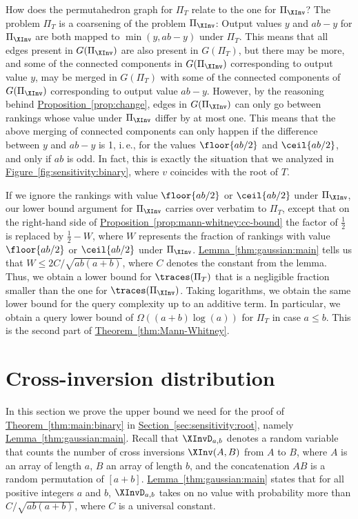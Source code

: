 \documentclass[11pt]{article}
\numberwithin{equation}{section}
\theoremstyle{definition}
\theoremstyle{plain}
\newcommand{\ie}{i.\,e.}
\newcommand{\expref}[2]{\hyperref[#2]{#1~\ref{#2}}}
\begin{document}
How does the permutahedron graph for $\Pi_T$ relate to the one for $\Pi_{\XInv}$? The problem $\Pi_T$ is a coarsening of the problem $\Pi_{\XInv}$: Output values $y$ and $ab-y$ for $\Pi_{\XInv}$ are both mapped to $\min(y,ab-y)$ under $\Pi_T$. This means that all edges present in $G(\Pi_{\XInv})$ are also present in $G(\Pi_T)$, but there may be more, and some of the connected components in $G(\Pi_{\XInv})$ corresponding to output value $y$, may be merged in $G(\Pi_T)$ with some of the connected components of $G(\Pi_{\XInv})$ corresponding to output value $ab-y$. However, by the reasoning behind \expref{Proposition}{prop:change}, edges in $G(\Pi_{\XInv})$ can only go between rankings whose value under $\Pi_{\XInv}$ differ by at most one. This means that the above merging of connected components can only happen if the difference between $y$ and $ab-y$ is 1, \ie, for the values $\floor{ab/2}$ and $\ceil{ab/2}$, and only if $ab$ is odd. In fact, this is exactly the situation that we analyzed in \expref{Figure}{fig:sensitivity:binary}, where $v$ coincides with the root of $T$. 

If we ignore the rankings with value $\floor{ab/2}$ or $\ceil{ab/2}$ under $\Pi_{\XInv}$, our lower bound argument for $\Pi_{\XInv}$ carries over verbatim to $\Pi_T$, except that on the right-hand side of \expref{Proposition}{prop:mann-whitney:cc-bound} the factor of $\frac{1}{2}$ is replaced by $\frac{1}{2}-W$, where $W$ represents the fraction of rankings with value $\floor{ab/2}$ or $\ceil{ab/2}$ under $\Pi_{\XInv}$. \expref{Lemma}{thm:gaussian:main} tells us that $W \le 2C/\sqrt{ab(a+b)}$, where $C$ denotes the constant from the lemma. Thus, we obtain a lower bound for $\traces(\Pi_T)$ that is a negligible fraction smaller than the one for $\traces(\Pi_{\XInv})$. Taking logarithms, we obtain the same lower bound for the query complexity up to an additive term. In particular, we obtain a query lower bound of $\Omega((a+b)\log(a))$ for $\Pi_T$ in case $a \le b$. This is the second part of \expref{Theorem}{thm:Mann-Whitney}.



\section{Cross-inversion distribution}
\label{sec:cross-inversions}
%
%
%
%

%
%
%
%
%
%
%
%
%

In this section we prove the upper bound we need for the proof of \expref{Theorem}{thm:main:binary} in \expref{Section}{sec:sensitivity:root}, namely \expref{Lemma}{thm:gaussian:main}. Recall that $\XInvD_{a,b}$ denotes a random variable that counts the number of cross inversions $\XInv(A,B)$ from $A$ to $B$, where $A$ is an array of length $a$, $B$ an array of length $b$, and the concatenation $AB$ is a random permutation of $[a+b]$.
\expref{Lemma}{thm:gaussian:main} states that for all positive integers $a$ and $b$, $\XInvD_{a,b}$ takes on no value with probability more than $C/\sqrt{ab(a+b)}$, where $C$ is a universal constant.
\end{document}
